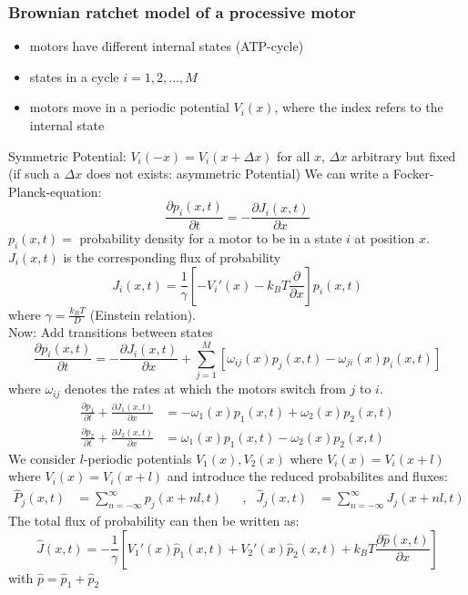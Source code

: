 \subsubsection{Brownian ratchet model of a processive motor}
\begin{itemize}[label={$\to$}]
	\item motors have different internal states (ATP-cycle)
	\item states in a cycle $i=1,2,\ldots ,M$
	\item motors move in a periodic potential $V_i(x)$, where the index refers to the internal state
\end{itemize}
Symmetric Potential: $V_i(-x)=V_i(x+\Delta x)$ for all $x$, $\Delta x$ arbitrary but fixed (if such a $\Delta x$ does not exists: asymmetric Potential)
We can write a Focker-Planck-equation:
\begin{equation*}
	\frac{\partial p_i(x,t)}{\partial t}=-\frac{\partial J_i(x,t)}{\partial x}
\end{equation*}
$p_i(x,t)=$ probability density for a motor to be in a state $i$ at position $x$.\\
$J_i(x,t)$ is the corresponding flux of probability
\begin{equation*}
	J_i(x,t)=\frac{1}{\gamma}\left[-V_i'(x)-k_BT\frac{\partial}{\partial x}\right]p_i(x,t)
\end{equation*}
where $\gamma=\frac{k_BT}{D}$ (Einstein relation).\\
Now: Add transitions between states
\begin{equation*}
	\frac{\partial p_i(x,t)}{\partial t}=-\frac{\partial J_i(x,t)}{\partial x} + \sum\limits_{j=1}^M\left[\omega_{ij}(x)p_j(x,t)-\omega_{ji}(x)p_i(x,t)\right]
\end{equation*}
where $\omega_{ij}$ denotes the rates at which the motors switch from $j$ to $i$.\\
\textbf{\underline{}}
\begin{align*}
	\frac{\partial p_1}{\partial t}+\frac{\partial J_1(x,t)}{\partial x}&=-\omega_1(x)p_1(x,t)+\omega_2(x)p_2(x,t)\\
	\frac{\partial p_2}{\partial t}+\frac{\partial J_2(x,t)}{\partial x}&=\omega_1(x)p_1(x,t)-\omega_2(x)p_2(x,t)
\end{align*}
We consider $l$-periodic potentials $V_1(x),V_2(x)$ where $V_i(x)=V_i(x+l)$ where $V_i(x)=V_i(x+l)$ and introduce the reduced probabilites and fluxes:
\begin{align*}
	\hat{P}_j(x,t)&=\sum\limits_{n=-\infty}^\infty p_j(x+nl,t) & &, & \hat{J}_j(x,t)&=\sum\limits_{n=-\infty}^\infty J_j(x+nl,t)
\end{align*}
The total flux of probability can then be written as:
\begin{equation*}
	\hat{J}(x,t)=-\frac{1}{\gamma}\left[V_1'(x)\hat{p}_1(x,t)+V_2'(x)\hat{p}_2(x,t)+k_BT\frac{\partial\hat{p}(x,t)}{\partial x}\right]
\end{equation*}
with $\hat{p}=\hat{p}_1+\hat{p}_2$
